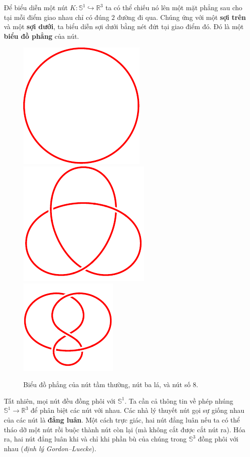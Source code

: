 \documentclass[12pt]{article}
\begin{document}
Để biểu diễn một nút $K: \mathbb{S}^1 \hookrightarrow \mathbb{R}^3$ ta có thể chiếu nó lên một mặt phẳng sau cho tại mỗi điểm giao nhau chỉ có đúng $2$ đường đi qua. Chúng ứng với một {\bf sợi trên} và một {\bf sợi dưới}, ta biểu diễn sợi dưới bằng nét đứt tại giao điểm đó.  Đó là một {\bf biểu đồ phẳng} của nút.

\begin{figure}[h!]
    \centering
    \includegraphics[scale = 1]{unknot.pdf} \hspace{2cm}
    \includegraphics[scale = 1]{trefoil.pdf}
    \hspace{2cm}
    \includegraphics[scale = 1.5]{figure 8.pdf}
    \caption{Biểu đồ phẳng của nút tầm thường, nút ba lá, và nút số 8.}
    \label{h10}
\end{figure}

Tất nhiên, mọi nút đều đồng phôi với $\mathbb{S}^1$. Ta cần cả thông tin về phép nhúng $\mathbb{S}^1 \to \mathbb{R}^3$ để phân biệt các nút với nhau. Các nhà lý thuyết nút gọi sự giống nhau của các nút là {\bf đẳng luân}. Một cách trực giác, hai nút đẳng luân nếu ta có thể tháo dỡ một nút rồi buộc thành nút còn lại (mà không cắt được cắt nút ra). Hóa ra, hai nút đẳng luân khi và chỉ khi phần bù của chúng trong $\mathbb{S}^3$ đồng phôi với nhau ({\it định lý Gordon--Luecke}).
\end{document}
